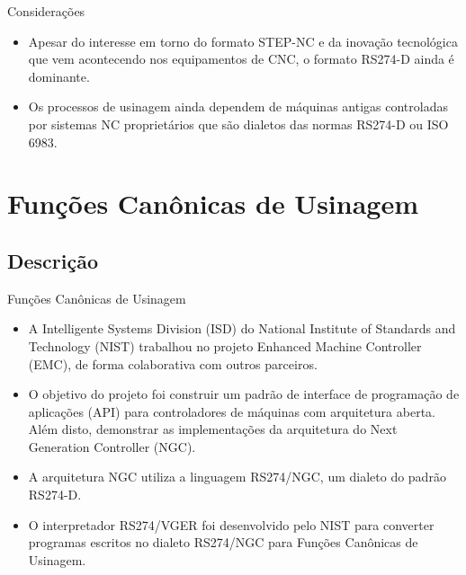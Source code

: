 \documentclass[aspectratio=169]{beamer}
\begin{document}
{\begin{frame}{Considerações}

  \begin{itemize}
    \item {
      Apesar do interesse em torno do formato STEP-NC e da inovação tecnológica
      que vem acontecendo nos equipamentos de CNC, o formato RS274-D ainda é dominante.
    }
    \item {
      Os processos de usinagem ainda dependem de máquinas antigas controladas
      por sistemas NC proprietários que são dialetos das normas RS274-D ou ISO 6983.
    }
  \end{itemize}   

\end{frame}

\section{Funções Canônicas de Usinagem}

\subsection{Descrição}

\begin{frame}{Funções Canônicas de Usinagem}
  \begin{itemize}
    \item{
      A Intelligente Systems Division (ISD) do National Institute of Standards and Technology (NIST) 
      trabalhou no projeto Enhanced Machine Controller (EMC), de forma colaborativa com outros parceiros.
    }
    \item {
      O objetivo do projeto foi construir um padrão de interface de programação de aplicações 
      (API) para controladores de máquinas com arquitetura aberta. 
      Além disto, demonstrar as implementações da arquitetura do Next Generation Controller (NGC).
    }
    \item {
      A arquitetura NGC utiliza a linguagem RS274/NGC, um dialeto do padrão RS274-D.
    }
    \item {
      O interpretador RS274/VGER foi desenvolvido pelo NIST para converter programas escritos no dialeto 
      RS274/NGC para Funções Canônicas de Usinagem.
    }
  \end{itemize}
\end{frame}


}
\end{document}
